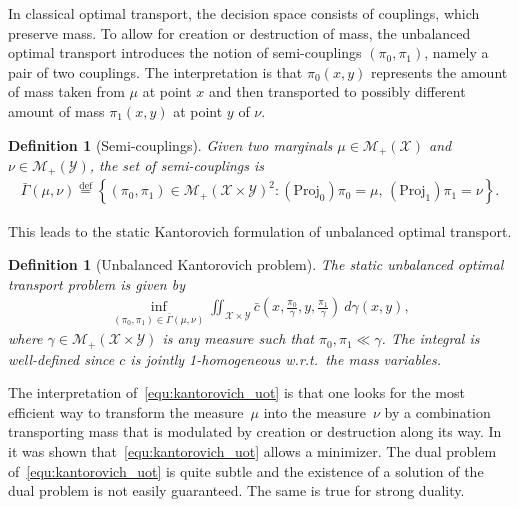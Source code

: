 \documentclass{article}
\newtheorem{definition}[theorem]{Definition}
\theoremstyle{definition}
\newcommand{\eqdef}{\mathrel{\overset{\mathrm{def}}{=}}}
\begin{document}
In classical optimal transport, the decision space consists of couplings, which preserve mass. To allow for creation or destruction of mass, the unbalanced optimal transport introduces the notion of semi-couplings $(\pi_0, \pi_1)$, namely a pair of two couplings. The interpretation is that $\pi_0(x,y)$ represents the amount of mass taken from $\mu$ at point $x$ and then transported to possibly different amount of mass $\pi_1(x,y)$ at point $y$ of $\nu$.

\begin{definition}[Semi-couplings]
Given two marginals $\mu \in \mathcal{M}_+(\mathcal{X})$ and~$\nu \in \mathcal{M}_+(\mathcal{Y})$, the set of semi-couplings is
	\begin{align}
		\bar \Gamma(\mu,\nu) \eqdef \left\{
			(\pi_0,\pi_1) \in \mathcal{M}_+(\mathcal{X} \times \mathcal{Y})^2  \colon
			(\mbox{Proj}_0) \pi_0 = \mu,\, (\mbox{Proj}_1) \pi_1 = \nu
			\right\}.
	\end{align}
\end{definition}
This leads to the static Kantorovich formulation of unbalanced optimal transport.

\begin{definition}[Unbalanced Kantorovich problem]
	The static unbalanced optimal transport problem is given by
	\begin{align}\tag{UKP}\label{equ:kantorovich_uot}
 		\inf_{(\pi_0, \pi_1) \in \bar \Gamma(\mu, \nu)}  \iint_{\mathcal{X} \times \mathcal{Y}} \bar c \left( x,\frac{ \pi_0}{ \gamma},y,\frac{ \pi_1}{ \gamma}\right)  \ d \gamma(x,y) , 
	\end{align}
where $\gamma \in \mathcal{M}_+(\mathcal{X} \times \mathcal{Y})$ is any measure such that $\pi_0, \pi_1 \ll \gamma$. The integral is well-defined since $c$ is jointly 1-homogeneous w.r.t.\ the mass variables. 
\end{definition}
The interpretation of~\eqref{equ:kantorovich_uot} is that one looks for the most efficient way to transform the measure~$\mu$ into the measure~$\nu$ by a combination transporting mass that is modulated by creation or destruction along its way. In~\cite[Proposition 3.4]{chizat2018unbalanced} it was shown that~\eqref{equ:kantorovich_uot} allows a minimizer. The dual problem of~\eqref{equ:kantorovich_uot} is quite subtle and the existence of a solution of the dual problem is not easily guaranteed. The same is true for strong duality.  \\
\end{document}
